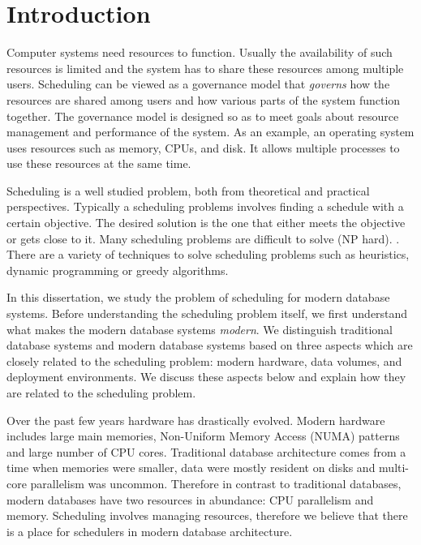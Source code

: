 \chapter{Introduction}
Computer systems need resources to function. 
Usually the availability of such resources is limited and the system has to share these resources among multiple users. 
Scheduling can be viewed as a governance model that \textit{governs} how the resources are shared among users and how various parts of the system function together. 
The governance model is designed so as to meet goals about resource management and performance of the system. 
As an example, an operating system uses resources such as memory, CPUs, and disk.
It allows multiple processes to use these resources at the same time. 

Scheduling is a well studied problem, both from theoretical and practical perspectives. 
Typically a scheduling problems involves finding a schedule with a certain objective.
The desired solution is the one that either meets the objective or gets close to it.
Many scheduling problems are difficult to solve (NP hard).
.
There are a variety of techniques to solve scheduling problems such as heuristics, dynamic programming or greedy algorithms. 

In this dissertation, we study the problem of scheduling for modern database systems.
Before understanding the scheduling problem itself, we first understand what makes the modern database systems \textit{modern}.
We distinguish traditional database systems and modern database systems based on three aspects which are closely related to the scheduling problem: modern hardware, data volumes, and deployment environments.
We discuss these aspects below and explain how they are related to the scheduling problem. 

Over the past few years hardware has drastically evolved. 
Modern hardware includes large main memories, Non-Uniform Memory Access (NUMA) patterns and large number of CPU cores.
Traditional database architecture comes from a time when memories were smaller, data were mostly resident on disks and multi-core parallelism was uncommon. 
Therefore in contrast to traditional databases, modern databases have two resources in abundance: CPU parallelism and memory.
Scheduling involves managing resources, therefore we believe that there is a place for schedulers in modern database architecture. 

